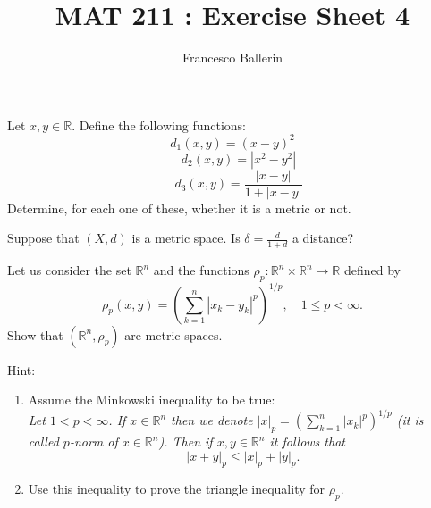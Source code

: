 \documentclass[11pt]{article}%
\title{MAT 211 : Exercise Sheet 4}
\author{Francesco Ballerin}
\date{\color{gray}{\small{francesco.ballerin@uib.no}}}
\begin{document}
\begin{minipage}[t]{\dimexpr \textwidth-6cm-\columnsep}
     \maketitle
\end{minipage}
\hfill\noindent{}

\vspace{50pt}

\begin{Exercise}[title=*$\dagger$]
	Let $x,y\in \mathbb R$. Define the following functions:
	$$d_1(x,y)=(x-y)^2$$
	$$\quad d_2(x,y)=|x^2-y^2|$$
	$$\quad d_3(x,y)=\frac{|x-y|}{1+|x-y|}$$
	Determine, for each one of these, whether it is a metric or not.\\
	\smallskip
\end{Exercise}
\begin{Exercise}[title=*]
	Suppose that $(X,d)$ is a metric space. Is $\delta=\frac{d}{1+d}$ a distance?
\end{Exercise}

\begin{Exercise}[title=** - $\ell_p$ spaces]
	Let us consider the set $\mathbb R^n$ and the functions $\rho_p\colon \mathbb R^n\times \mathbb R^n\to \mathbb R$ defined by $$\rho_p(x,y)=(\sum_{k=1}^{n}|x_k-y_k|^p)^{1/p},\quad 1\leq p<\infty.$$ Show that $(\mathbb R^n, \rho_p)$ are metric spaces.
	
	Hint:
	\begin{enumerate}[label={\alph*)}]
		\item {Assume the Minkowski inequality to be true:\\{\it Let $1<p<\infty$. If $x\in\mathbb R^n$ then we denote $|x|_p=(\sum_{k=1}^{n}|x_k|^p)^{1/p}$ (it is called $p$-norm of $x\in \mathbb R^n$).  Then if $x,y\in\mathbb R^n$ it follows that $$|x+y|_p\leq|x|_p+|y|_p.$$}}
		\item {Use this inequality to prove the triangle inequality for $\rho_p$.}
	\end{enumerate}
\end{Exercise}
\end{document}
